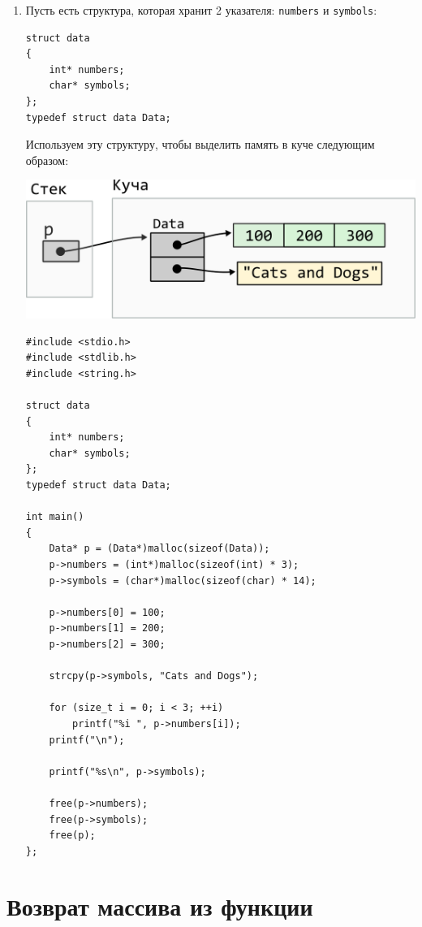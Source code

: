 \documentclass[10pt]{article}
\begin{document}
\begin{enumerate}
\item Пусть есть структура, которая хранит 2 указателя: \texttt{numbers} и \texttt{symbols}:
\begin{lstlisting}
struct data 
{
    int* numbers;
    char* symbols;
};
typedef struct data Data;
\end{lstlisting}

Используем эту структуру, чтобы выделить память в куче следующим образом:
\begin{center}
\includegraphics[scale=0.83]{../images/malloc_class_tasks/heap_struct_with_pointers.png}
\end{center}
\begin{lstlisting}[style=boxStyle]
#include <stdio.h>
#include <stdlib.h>
#include <string.h>

struct data
{
    int* numbers;
    char* symbols;
};
typedef struct data Data;

int main()
{
    Data* p = (Data*)malloc(sizeof(Data));
    p->numbers = (int*)malloc(sizeof(int) * 3);
    p->symbols = (char*)malloc(sizeof(char) * 14);

    p->numbers[0] = 100;
    p->numbers[1] = 200;
    p->numbers[2] = 300;

    strcpy(p->symbols, "Cats and Dogs");

    for (size_t i = 0; i < 3; ++i)
        printf("%i ", p->numbers[i]);
    printf("\n");

    printf("%s\n", p->symbols);

    free(p->numbers);
    free(p->symbols);
    free(p);
};
\end{lstlisting}

\end{enumerate}



\newpage
\section*{Возврат массива из функции}
\end{document}
